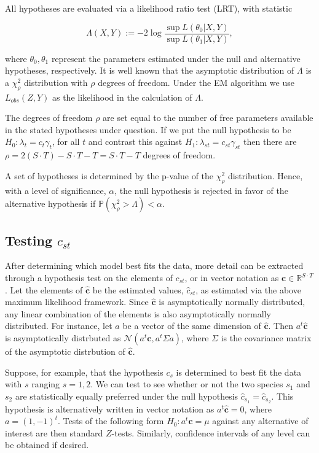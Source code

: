 All hypotheses are evaluated via a likelihood ratio test (LRT), with statistic

\begin{equation*}
  \label{eq:LRT}
    \Lambda(X,Y) := -2 \log{ \frac{ \sup L(\theta_0|X,Y)}{ \sup L(\theta_1|X,Y)} },
\end{equation*}

\noindent where $\theta_0, \theta_1$ represent the parameters estimated under the null and alternative hypotheses, respectively.  It is well known that the asymptotic distribution of $\Lambda$ is a $\chi_{\rho}^2$ distribution with $\rho$ degrees of freedom.  Under the EM algorithm we use $L_{obs}(Z,Y)$ as the likelihood in the calculation of $\Lambda$.  

The degrees of freedom $\rho$ are set equal to the number of free parameters available in the stated hypotheses under question.  If we put the null hypothesis to be $H_0: \lambda_t = c_t \gamma_t$, for all $t$ and contrast this against $H_1: \lambda_{st} = c_{st}\gamma_{st}$ then there are $\rho = 2(S \cdot T) - S \cdot T - T = S \cdot T - T$ degrees of freedom.

A set of hypotheses is determined by the p-value of the $\chi^2_{\rho}$ distribution.  Hence, with a level of significance, $\alpha$, the null hypothesis is rejected in favor of the alternative hypothesis if $\mathbb{P}(\chi^2_{\rho} > \Lambda) < \alpha$.  

\subsection{Testing $c_{st}$}

After determining which model best fits the data, more detail can be extracted through a hypothesis test on the elements of $c_{st}$, or in vector notation as $\mathbf{c} \in \mathbb{R}^{S\cdot T}$.  Let the elements of $\hat{\mathbf{c}}$ be the estimated values, $\hat{c}_{st}$, as estimated via the above maximum likelihood framework.  Since $\hat{\mathbf{c}}$ is asymptotically normally distributed, any linear combination of the elements is also asymptotically normally distributed.  For instance, let $a$ be a vector of the same dimension of $\hat{\mathbf{c}}$.  Then $a^t\hat{\mathbf{c}}$ is asymptotically distrbuted as $\mathcal{N}(a^t\mathbf{c}, a^t\Sigma a)$, where $\Sigma$ is the covariance matrix of the asymptotic distrbution of $\hat{\mathbf{c}}$.  

Suppose, for example, that the hypothesis $c_s$ is determined to best fit the data with $s$ ranging $s = 1, 2$.  We can test to see whether or not the two species $s_1$ and $s_2$ are statistically equally preferred under the null hypothesis $\hat{c}_{s_1} = \hat{c}_{s_2}$.  This hypothesis is alternatively written in vector notation as $a^t\hat{\mathbf{c}} = 0$, where $a = (1, -1)^t$.  Tests of the following form $H_0: a^t\mathbf{c} = \mu$ against any alternative of interest are then standard $Z$-tests.  Similarly, confidence intervals of any level can be obtained if desired. 

